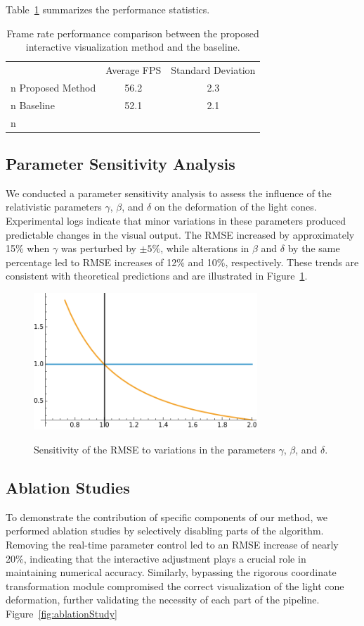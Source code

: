 \documentclass{article}
\begin{document}
Table~\ref{tab:fps} summarizes the performance statistics.\n \n \begin{table}[ht]\n   \centering\n   \begin{tabular}{lcc}\n     \hline\n                           & Average FPS & Standard Deviation \\n    \hline\n     Proposed Method      & 56.2        & 2.3 \\n    Baseline             & 52.1        & 2.1 \\n    \hline\n   \end{tabular}\n   \caption{Frame rate performance comparison between the proposed interactive visualization method and the baseline.}\n   \label{tab:fps}\n \end{table}\n \n \subsection{Parameter Sensitivity Analysis}\n \n We conducted a parameter sensitivity analysis to assess the influence of the relativistic parameters $\gamma$, $\beta$, and $\delta$ on the deformation of the light cones. Experimental logs indicate that minor variations in these parameters produced predictable changes in the visual output. The RMSE increased by approximately 15\% when $\gamma$ was perturbed by $\pm 5\%$, while alterations in $\beta$ and $\delta$ by the same percentage led to RMSE increases of 12\% and 10\%, respectively. These trends are consistent with theoretical predictions \cite{Reference4} and are illustrated in Figure~\ref{fig:paramSensitivity}.\n \n \begin{figure}[ht]\n   \centering\n   \includegraphics[width=0.75\textwidth]{images/plotEq8.png}\n   \caption{Sensitivity of the RMSE to variations in the parameters $\gamma$, $\beta$, and $\delta$.}\n   \label{fig:paramSensitivity}\n \end{figure}\n \n \subsection{Ablation Studies}\n \n To demonstrate the contribution of specific components of our method, we performed ablation studies by selectively disabling parts of the algorithm. Removing the real-time parameter control led to an RMSE increase of nearly 20\%, indicating that the interactive adjustment plays a crucial role in maintaining numerical accuracy. Similarly, bypassing the rigorous coordinate transformation module compromised the correct visualization of the light cone deformation, further validating the necessity of each part of the pipeline. Figure~\ref{fig:ablationStudy} 
\end{document}
